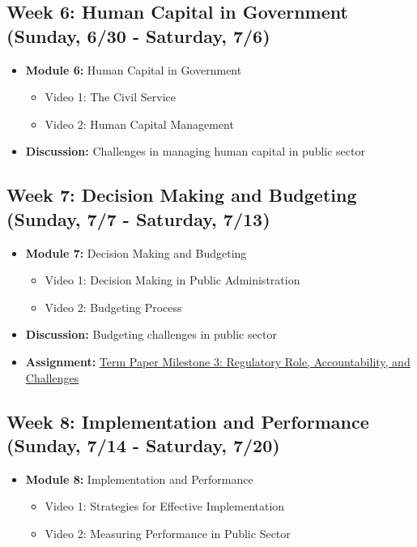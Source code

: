 \documentclass[11pt, letterpaper]{article}
\begin{document}
\subsection*{Week 6: Human Capital in Government (Sunday, 6/30 - Saturday, 7/6)}
\begin{itemize}
    \item \textbf{Module 6:} Human Capital in Government
    \begin{itemize}
        \item Video 1: The Civil Service
        \item Video 2: Human Capital Management
    \end{itemize}
    \item \textbf{Discussion:} Challenges in managing human capital in public sector
\end{itemize}

\subsection*{Week 7: Decision Making and Budgeting (Sunday, 7/7 - Saturday, 7/13)}
\begin{itemize}
    \item \textbf{Module 7:} Decision Making and Budgeting
    \begin{itemize}
        \item Video 1: Decision Making in Public Administration
        \item Video 2: Budgeting Process
    \end{itemize}
    \item \textbf{Discussion:} Budgeting challenges in public sector
    \item \textbf{Assignment:} \href{https://us.kritik.io/course/cltwics8d035m146piz0jn5t0/assignment/clwms5jnp010712k819w1oes6?resultsPerPage=50&page=1&filterBy=SHOW_ALL&searchString=&sortBy=NAME&sortOrder=1&viewType=Progress}{Term Paper Milestone 3: Regulatory Role, Accountability, and Challenges}
\end{itemize}

\subsection*{Week 8: Implementation and Performance (Sunday, 7/14 - Saturday, 7/20)}
\begin{itemize}
    \item \textbf{Module 8:} Implementation and Performance
    \begin{itemize}
        \item Video 1: Strategies for Effective Implementation
        \item Video 2: Measuring Performance in Public Sector
    \end{itemize}
\end{itemize}
\end{document}
